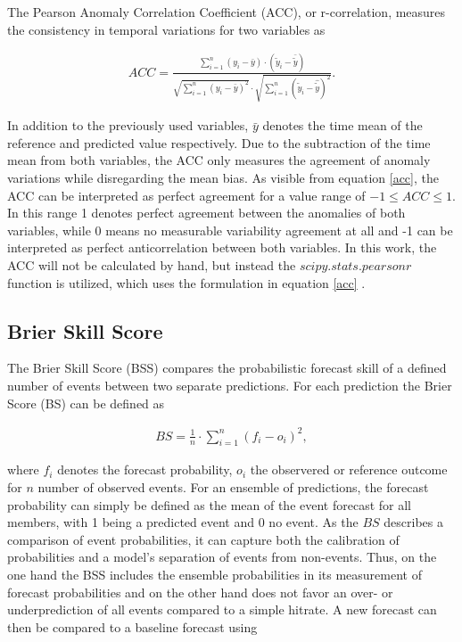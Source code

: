 \documentclass[ba-lentz.tex]{subfile}
\begin{document}
The Pearson Anomaly Correlation Coefficient (ACC), or r-correlation, measures the consistency in temporal variations for two variables as

\begin{align}
    ACC = \frac{\sum_{i=1}^{n} (y_i - \bar{y}) \cdot (\tilde{y}_i - \bar{\tilde{y}})}{\sqrt{\sum_{i=1}^{n} (y_i - \bar{y})^2} \cdot \sqrt{\sum_{i=1}^{n} (\tilde{y}_i - \hat{\tilde{y}})^2}} . \label{acc}
\end{align}

In addition to the previously used variables, $\bar{y}$ denotes the time mean of the reference and predicted value respectively.
Due to the subtraction of the time mean from both variables, the ACC only measures the agreement of anomaly variations while disregarding the mean bias.
As visible from equation \ref{acc}, the ACC can be interpreted as perfect agreement for a value range of $-1 \leq ACC \leq 1$.
In this range 1 denotes perfect agreement between the anomalies of both variables, while 0 means no measurable variability agreement at all and -1 can be interpreted as perfect anticorrelation between both variables.
In this work, the ACC will not be calculated by hand, but instead the $scipy.stats.pearsonr$ function is utilized, which uses the formulation in equation \ref{acc} \parencite{virtanen_scipy_2020}.


\subsection{Brier Skill Score}

The Brier Skill Score (BSS) compares the probabilistic forecast skill of a defined number of events between two separate predictions.
For each prediction the Brier Score (BS) can be defined as

\begin{align}
    BS = \frac{1}{n} \cdot \sum_{i=1}^{n} (f_i - o_i)^2 , \label{bs}
\end{align}

where $f_i$ denotes the forecast probability, $o_i$ the observered or reference outcome for $n$ number of observed events.
For an ensemble of predictions, the forecast probability can simply be defined as the mean of the event forecast for all members, with 1 being a predicted event and 0 no event.
As the $BS$ describes a comparison of event probabilities, it can capture both the calibration of probabilities and a model's separation of events from non-events.
Thus, on the one hand the BSS includes the ensemble probabilities in its measurement of forecast probabilities and on the other hand does not favor an over- or underprediction of all events compared to a simple hitrate.
A new forecast can then be compared to a baseline forecast using
\end{document}
